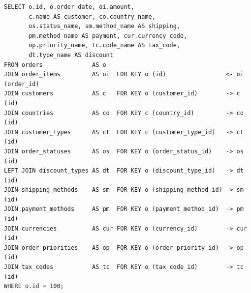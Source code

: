 \documentclass[12pt]{article}
\newcommand{\FanoutCheckHeight}[3]{%
  \ifdim\dimexpr\ht#1+\dp#1\relax>#2\relax
    \PackageError{fanout-layout}{#3 exceeds its vertical allocation}%
      {Adjust the terminal line spacing or the box position.}%
  \fi
}
\begin{document}
\newsavebox{\canonicalStageTwelve}
\begin{lrbox}{\canonicalStageTwelve}\begin{minipage}{344mm}
\begin{NoHyper}
\begin{lstlisting}[style=complex-sql]
SELECT o.id, o.order_date, oi.amount,
       c.name AS customer, co.country_name,
       os.status_name, sm.method_name AS shipping,
       pm.method_name AS payment, cur.currency_code,
       op.priority_name, tc.code_name AS tax_code,
       dt.type_name AS discount
FROM orders              AS o
JOIN order_items         AS oi  FOR KEY o (id)                 <- oi (order_id)
JOIN customers           AS c   FOR KEY o (customer_id)        -> c (id)
JOIN countries           AS co  FOR KEY c (country_id)         -> co (id)
JOIN customer_types      AS ct  FOR KEY c (customer_type_id)   -> ct (id)
JOIN order_statuses      AS os  FOR KEY o (order_status_id)    -> os (id)
LEFT JOIN discount_types AS dt  FOR KEY o (discount_type_id)   -> dt (id)
JOIN shipping_methods    AS sm  FOR KEY o (shipping_method_id) -> sm (id)
JOIN payment_methods     AS pm  FOR KEY o (payment_method_id)  -> pm (id)
JOIN currencies          AS cur FOR KEY o (currency_id)        -> cur (id)
JOIN order_priorities    AS op  FOR KEY o (order_priority_id)  -> op (id)
JOIN tax_codes           AS tc  FOR KEY o (tax_code_id)        -> tc (id)
WHERE o.id = 100;
\end{lstlisting}
\end{NoHyper}
\end{minipage}\end{lrbox}
\FanoutCheckHeight{\canonicalStageTwelve}{122mm}{Canonical-form state 12}
\end{document}

